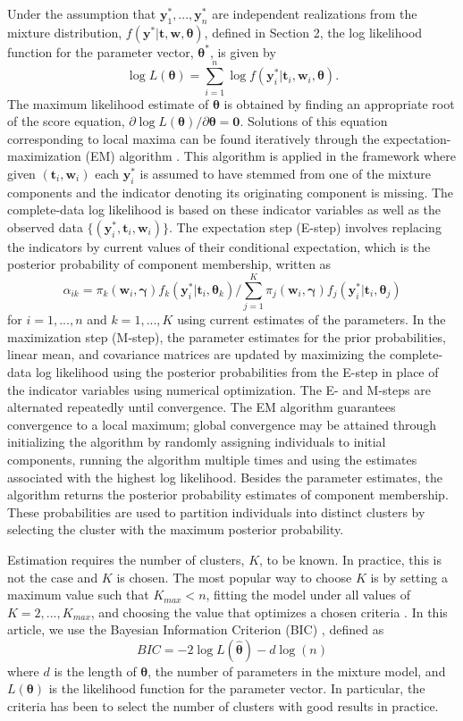 \documentclass[12pt]{article}
\newcommand{\B}[0]{\mathbf}
\newcommand{\BS}[0]{\boldsymbol}
\begin{document}
Under the assumption that $\B y^{*}_{1},...,\B y^{*}_{n}$ are independent realizations from the mixture distribution, $f(\B y^{*} | \B t, \B w, \BS\theta)$, defined in Section 2, the log likelihood function for the parameter vector, $\BS \theta^{*}$, is given by
$$\log L(\BS\theta)=\sum^{n}_{i=1}\log f(\B y^{*}_{i}|\B t_{i},\B w_{i},\BS \theta).$$
The maximum likelihood estimate of $\BS\theta$ is obtained by finding an appropriate root of the score equation, $\partial \log L(\BS\theta)/\partial \BS\theta=\B 0.$ Solutions of this equation corresponding to local maxima can be found iteratively through the expectation-maximization (EM) algorithm \cite{dempster1977}. This algorithm is applied in the framework where given $(\B t_{i},\B w_{i})$ each $\B y^{*}_{i}$ is assumed to have stemmed from one of the mixture components and the indicator denoting its originating component is missing. The complete-data log likelihood is based on these indicator variables as well as the observed data $\{(\B y^{*}_{i}, \B t_{i}, \B w_{i})\}$. The expectation step (E-step) involves replacing the indicators by current values of their conditional expectation, which is the posterior probability of component membership, written as
$$\alpha_{ik}=\pi_{k}(\B w_{i},\BS\gamma)f_{k}(\B y^{*}_{i}|\B t_{i},\BS\theta_{k})/\sum_{j=1}^{K}\pi_{j}(\B w_{i},\BS\gamma)f_{j}(\B y^{*}_{i}|\B t_{i},\BS \theta_{j})$$
for $i=1,...,n$ and $k=1,...,K$ using current estimates of the parameters. In the maximization step (M-step), the parameter estimates for the prior probabilities, linear mean, and covariance matrices are updated by maximizing the complete-data log likelihood using the posterior probabilities from the E-step in place of the indicator variables using numerical optimization. The E- and M-steps are alternated repeatedly until convergence. The EM algorithm guarantees convergence to a local maximum; global convergence may be attained through initializing the algorithm by randomly assigning individuals to initial components, running the algorithm multiple times and using the estimates associated with the highest log likelihood. Besides the parameter estimates, the algorithm returns the posterior probability estimates of component membership. These probabilities are used to partition individuals into distinct clusters by selecting the cluster with the maximum posterior probability.

Estimation requires the number of clusters, $K$, to be known. In practice, this is not the case and $K$ is chosen. The most popular way to choose $K$ is by setting a maximum value such that $K_{max}<n$, fitting the model under all values of $K=2,...,K_{max}$, and choosing the value that optimizes a chosen criteria \cite{celeux1996,fraley1998}. In this article, we use the Bayesian Information Criterion (BIC) \cite{schwarz1978}, defined as
$$BIC = -2\log L(\hat{\BS\theta})- d\log(n)$$
where $d$ is the length of $\BS\theta$, the number of parameters in the mixture model, and $L(\BS\theta)$ is the likelihood function for the parameter vector.  In particular, the criteria has been to select the number of clusters \cite{dasgupta1999,fraley1999} with good results in practice.
\end{document}
